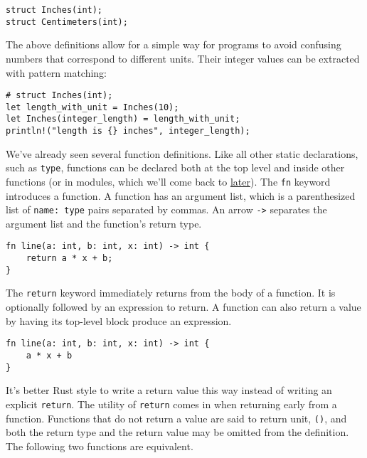 \documentclass[]{article}
\begin{document}
\begin{verbatim}
struct Inches(int);
struct Centimeters(int);
\end{verbatim}

The above definitions allow for a simple way for programs to avoid
confusing numbers that correspond to different units. Their integer
values can be extracted with pattern matching:

\begin{verbatim}
# struct Inches(int);
let length_with_unit = Inches(10);
let Inches(integer_length) = length_with_unit;
println!("length is {} inches", integer_length);
\end{verbatim}


We've already seen several function definitions. Like all other static
declarations, such as \texttt{type}, functions can be declared both at
the top level and inside other functions (or in modules, which we'll
come back to \hyperref[crates-and-the-module-system]{later}). The
\texttt{fn} keyword introduces a function. A function has an argument
list, which is a parenthesized list of \texttt{name: type} pairs
separated by commas. An arrow \texttt{-\textgreater{}} separates the
argument list and the function's return type.

\begin{verbatim}
fn line(a: int, b: int, x: int) -> int {
    return a * x + b;
}
\end{verbatim}

The \texttt{return} keyword immediately returns from the body of a
function. It is optionally followed by an expression to return. A
function can also return a value by having its top-level block produce
an expression.

\begin{verbatim}
fn line(a: int, b: int, x: int) -> int {
    a * x + b
}
\end{verbatim}

It's better Rust style to write a return value this way instead of
writing an explicit \texttt{return}. The utility of \texttt{return}
comes in when returning early from a function. Functions that do not
return a value are said to return unit, \texttt{()}, and both the return
type and the return value may be omitted from the definition. The
following two functions are equivalent.
\end{document}
